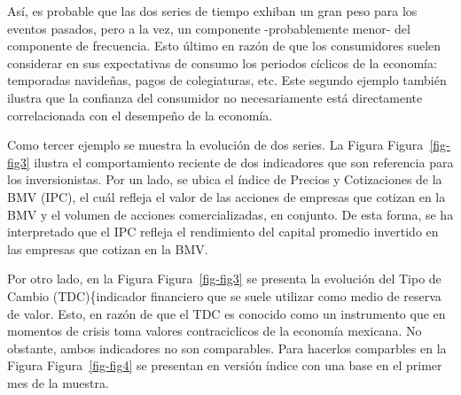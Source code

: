 \documentclass[
  a4paper,
]{article}
\begin{document}
Así, es probable que las dos series de tiempo exhiban un gran peso para
los eventos pasados, pero a la vez, un componente -probablemente menor-
del componente de frecuencia. Esto último en razón de que los
consumidores suelen considerar en sus expectativas de consumo los
periodos cíclicos de la economía: temporadas navideñas, pagos de
colegiaturas, etc. Este segundo ejemplo también ilustra que la confianza
del consumidor no necesariamente está directamente correlacionada con el
desempeño de la economía.

Como tercer ejemplo se muestra la evolución de dos series. La Figura
Figura~\ref{fig-fig3} ilustra el comportamiento reciente de dos
indicadores que son referencia para los inversionistas. Por un lado, se
ubica el índice de Precios y Cotizaciones de la BMV (IPC), el cuál
refleja el valor de las acciones de empresas que cotizan en la BMV y el
volumen de acciones comercializadas, en conjunto. De esta forma, se ha
interpretado que el IPC refleja el rendimiento del capital promedio
invertido en las empresas que cotizan en la BMV.

Por otro lado, en la Figura Figura~\ref{fig-fig3} se presenta la
evolución del Tipo de Cambio (TDC)\{indicador financiero que se suele
utilizar como medio de reserva de valor. Esto, en razón de que el TDC es
conocido como un instrumento que en momentos de crisis toma valores
contraciclicos de la economía mexicana. No obstante, ambos indicadores
no son comparables. Para hacerlos comparbles en la Figura
Figura~\ref{fig-fig4} se presentan en versión índice con una base en el
primer mes de la muestra.
\end{document}
